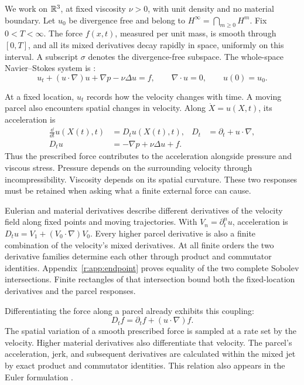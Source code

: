 We work on \(\mathbb R^3\), at fixed viscosity \(\nu>0\), with unit density
and no material boundary. Let \(u_0\) be divergence free and belong to
\(H^\infty=\bigcap_{m\ge0}H^m\). Fix \(0<T<\infty\). The force
\(f(x,t)\), measured per unit mass, is smooth through \([0,T]\), and
all its mixed derivatives decay rapidly in space, uniformly on this
interval. A subscript \(\sigma\) denotes the divergence-free subspace.
The whole-space Navier--Stokes system is
\cite[equations~(1)--(3)]{Fefferman2006}:
\begin{equation}
 u_t+(u\cdot\nabla)u+\nabla p-\nu\Delta u=f,
 \qquad \nabla\cdot u=0,\qquad u(0)=u_0.
 \label{r:eq:ns}
\end{equation}

At a fixed location, \(u_t\) records how the velocity changes with time.
A moving parcel also encounters spatial changes in velocity. Along
\(\dot X=u(X,t)\), its acceleration is
\begin{equation}
 \begin{aligned}
 \frac{\dd}{\dd t}u(X(t),t)&=D_tu(X(t),t),
 &D_t&=\partial_t+u\cdot\nabla,\\
 D_tu&=-\nabla p+\nu\Delta u+f.
 \end{aligned}
 \label{r:eq:parcel-law}
\end{equation}
Thus the prescribed force contributes to the acceleration alongside
pressure and viscous stress. Pressure depends on the surrounding velocity
through incompressibility. Viscosity depends on its spatial curvature.
These two responses must be retained when asking what a finite external
force can cause.

Eulerian and material derivatives describe different derivatives of
the velocity field along fixed points and moving trajectories. With \(V_n=\partial_t^nu\), acceleration is
\(D_tu=V_1+(V_0\cdot\nabla)V_0\). Every higher parcel derivative is
also a finite combination of the velocity's mixed derivatives.
At all finite orders the two derivative families determine each other
through product and commutator identities.
Appendix~\ref{r:app:endpoint} proves equality of the two complete Sobolev
intersections. Finite rectangles of that intersection bound both
the fixed-location derivatives and the parcel responses.

Differentiating the force along a parcel already exhibits this coupling:
\[
 D_tf=\partial_tf+(u\cdot\nabla)f.
\]
The spatial variation of a smooth prescribed force is sampled at a rate
set by the velocity. Higher material derivatives also differentiate that
velocity. The parcel's acceleration, jerk, and subsequent derivatives
are calculated within the mixed jet by exact product and commutator
identities. This relation also appears in the
Euler formulation \cite[Section~1; Proposition~6.1]{birnie-euler}.

